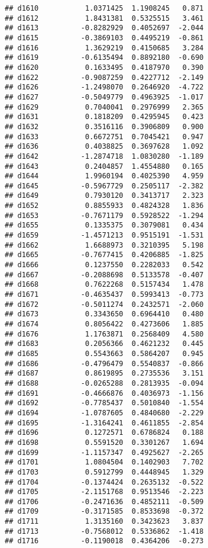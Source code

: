 \documentclass[
]{article}
\begin{document}
\begin{verbatim}
## d1610           1.0371425  1.1908245   0.871
## d1612           1.8431381  0.5325515   3.461
## d1613          -0.8282929  0.4052697  -2.044
## d1615          -0.3869103  0.4495219  -0.861
## d1616           1.3629219  0.4150685   3.284
## d1619          -0.6135494  0.8892180  -0.690
## d1620           0.1633495  0.4187970   0.390
## d1622          -0.9087259  0.4227712  -2.149
## d1626          -1.2498070  0.2646920  -4.722
## d1627          -0.5049779  0.4963925  -1.017
## d1629           0.7040041  0.2976999   2.365
## d1631           0.1818209  0.4295945   0.423
## d1632           0.3516116  0.3906809   0.900
## d1633           0.6672751  0.7045421   0.947
## d1636           0.4038825  0.3697628   1.092
## d1642          -1.2874718  1.0830280  -1.189
## d1643           0.2404857  1.4554880   0.165
## d1644           1.9960194  0.4025390   4.959
## d1645          -0.5967729  0.2505117  -2.382
## d1649           0.7930120  0.3413717   2.323
## d1652           0.8855933  0.4824328   1.836
## d1653          -0.7671179  0.5928522  -1.294
## d1655           0.1335375  0.3079081   0.434
## d1659          -1.4571213  0.9515191  -1.531
## d1662           1.6688973  0.3210395   5.198
## d1665          -0.7677415  0.4206885  -1.825
## d1666           0.1237550  0.2282033   0.542
## d1667          -0.2088698  0.5133578  -0.407
## d1668           0.7622268  0.5157434   1.478
## d1671          -0.4635437  0.5993413  -0.773
## d1672          -0.5011274  0.2432571  -2.060
## d1673           0.3343650  0.6964410   0.480
## d1674           0.8056422  0.4273606   1.885
## d1676           1.1763871  0.2568409   4.580
## d1683           0.2056366  0.4621232   0.445
## d1685           0.5543663  0.5864207   0.945
## d1686          -0.4796479  0.5540837  -0.866
## d1687           0.8619895  0.2735536   3.151
## d1688          -0.0265288  0.2813935  -0.094
## d1691          -0.4666876  0.4036973  -1.156
## d1692          -0.7785437  0.5010840  -1.554
## d1694          -1.0787605  0.4840680  -2.229
## d1695          -1.3164241  0.4611855  -2.854
## d1696           0.1272571  0.6786824   0.188
## d1698           0.5591520  0.3301267   1.694
## d1699          -1.1157347  0.4925627  -2.265
## d1701           1.0804504  0.1402903   7.702
## d1703           0.5912799  0.4448945   1.329
## d1704          -0.1374424  0.2635132  -0.522
## d1705          -2.1151768  0.9513546  -2.223
## d1706          -0.2471636  0.4852111  -0.509
## d1709          -0.3171585  0.8533698  -0.372
## d1711           1.3135160  0.3423623   3.837
## d1713          -0.7568012  0.5336862  -1.418
## d1716          -0.1190018  0.4364206  -0.273

\end{verbatim}
\end{document}
